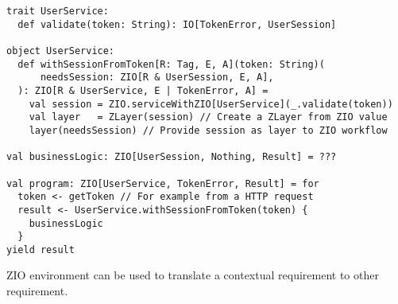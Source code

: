 \begin{algorithm}

\begin{verbatim}
trait UserService:
  def validate(token: String): IO[TokenError, UserSession]

object UserService:
  def withSessionFromToken[R: Tag, E, A](token: String)(
      needsSession: ZIO[R & UserSession, E, A],
  ): ZIO[R & UserService, E | TokenError, A] =
    val session = ZIO.serviceWithZIO[UserService](_.validate(token))
    val layer   = ZLayer(session) // Create a ZLayer from ZIO value
    layer(needsSession) // Provide session as layer to ZIO workflow

val businessLogic: ZIO[UserSession, Nothing, Result] = ???

val program: ZIO[UserService, TokenError, Result] = for
  token <- getToken // For example from a HTTP request
  result <- UserService.withSessionFromToken(token) {
    businessLogic
  }
yield result
\end{verbatim}

\caption{ZIO environment can be used to translate a contextual requirement to other requirement. \label{zio:user-session}}
\end{algorithm}